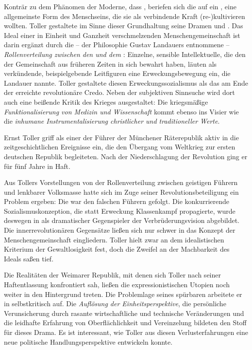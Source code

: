 Konträr zu dem Phänomen der Moderne, dass \Cite{Selbstvergewisserung nur über
  einen prinzipiell nicht verallgemeinerungsfähigen Reflexionsprozess erreicht
  werden kann}, beriefen sich die \Cite{'O
  Mensch'-Expressionisten} auf ein , eine allgemeinste Form des
Menschseins, die sie als verbindende Kraft (re-)kultivieren wollten. Toller
gestaltete im Sinne dieser Grundhaltung seine Dramen  und
. Das Ideal einer in Einheit und Ganzheit
verschmelzenden Menschengemeinschaft ist darin ergänzt durch die -- der
Philosophie Gustav Landauers entnommene -- \emph{Rollenverteilung zwischen den
  \Cite{Geistigen} und dem \Cite{Volk}}: Einzelne, sensible Intellektuelle,
die den \Cite{Geist} der Gemeinschaft aus früheren Zeiten in sich bewahrt
haben, läuten als verkündende, beispielgebende Leitfiguren eine
Erweckungsbewegung ein, die Landauer 
nannte.  Toller gestaltete diesen
Erweckungssozialismus als das am Ende der  erreichte
revolutionäre Credo. Neben der subjektiven Sinnsuche wird dort auch eine
beißende Kritik des Krieges ausgestaltet: Die kriegsmäßige
\emph{Funktionalisierung von Medizin und Wissenschaft} kommt ebenso
ins Visier wie die \emph{inhumane Instrumentalisierung christlicher und
  traditioneller Werte}.

Ernst Toller griff als einer der Führer der Münchener Räterepublik aktiv in
die zeitgeschichtlichen Ereignisse ein, die den Übergang vom Weltkrieg zur
ersten deutschen Republik begleiteten. Nach der Niederschlagung der Revolution
ging er für fünf Jahre in Haft.  

Aus Tollers Vorstellungen von der Rollenverteilung zwischen geistigen Führern und
lenkbarer Volksmasse hatte sich im Zuge seiner Revolutionsbeteiligung ein
Problem ergeben: Die \Cite{Masse} war den falschen Führern gefolgt. Die
konkurrierende Sozialismuskonzeption, die statt Erweckung Klassenkampf
propagierte, wurde deswegen in  als dramatischer
Gegenspieler der Verbrüderungsvision abgebildet.
Die innerrevolutionären Gegensätze ließen sich nur schwer in das Konzept der
Menschengemeinschaft eingliedern. Toller hielt zwar an dem idealistischen Kriterium
der Gewaltlosigkeit fest, doch die Zweifel an der Machbarkeit des Ideals saßen
tief.

Die Realitäten der Weimarer Republik, mit denen sich Toller nach seiner
Haftentlassung konfrontiert sah, ließen die expressionistischen Utopien noch
weiter in den Hintergrund treten. Die Problemlage seines spürbaren
 arbeitete er in  selbstkritisch auf. Die \emph{Auflösung der Einheitsperspektive},
die persönliche Verunsicherung durch rasante wirtschaftliche und technische
Veränderungen und die leidhafte Erfahrung von Oberflächlichkeit und Vereinzelung
bildeten den Stoff für dieses Drama. Es ist interessant, wie Toller aus diesen
Verlusterfahrungen eine neue politische Handlungsperspektive entwickeln konnte.

